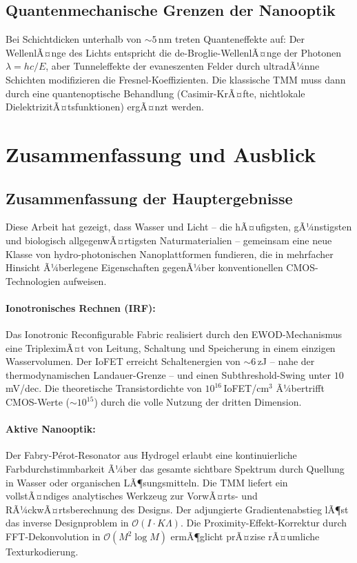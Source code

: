 ﻿\documentclass[a4paper,12pt]{scrreprt}
\theoremstyle{definition}
\newcommand{\ordre}[1]{\mathcal{O}\!\left(#1\right)}
\begin{document}
\subsection{Quantenmechanische Grenzen der Nanooptik}

Bei Schichtdicken unterhalb von $\sim 5$\,nm treten Quanteneffekte auf:
Der WellenlÃ¤nge des Lichts entspricht die de-Broglie-WellenlÃ¤nge der
Photonen $\lambda = hc/E$, aber Tunneleffekte der evaneszenten Felder
durch ultradÃ¼nne Schichten modifizieren die Fresnel-Koeffizienten. Die
klassische TMM muss dann durch eine quantenoptische Behandlung (Casimir-KrÃ¤fte,
nichtlokale DielektrizitÃ¤tsfunktionen) ergÃ¤nzt werden.

\section{Zusammenfassung und Ausblick}

\subsection{Zusammenfassung der Hauptergebnisse}

Diese Arbeit hat gezeigt, dass Wasser und Licht -- die hÃ¤ufigsten, gÃ¼nstigsten
und biologisch allgegenwÃ¤rtigsten Naturmaterialien -- gemeinsam eine neue Klasse
von hydro-photonischen Nanoplattformen fundieren, die in mehrfacher Hinsicht
Ã¼berlegene Eigenschaften gegenÃ¼ber konventionellen CMOS-Technologien aufweisen.

\paragraph{Ionotronisches Rechnen (IRF):}
Das Ionotronic Reconfigurable Fabric realisiert durch den EWOD-Mechanismus
eine TripleximÃ¤t von Leitung, Schaltung und Speicherung in einem einzigen
Wasservolumen. Der IoFET erreicht Schaltenergien von $\sim 6$\,zJ -- nahe
der thermodynamischen Landauer-Grenze -- und einen Subthreshold-Swing unter
$10$\,mV/dec. Die theoretische Transistordichte von $10^{16}$\,IoFET/cm$^3$
Ã¼bertrifft CMOS-Werte ($\sim 10^{15}$) durch die volle Nutzung der dritten
Dimension.

\paragraph{Aktive Nanooptik:}
Der Fabry-P{\'e}rot-Resonator aus Hydrogel erlaubt eine kontinuierliche
Farbdurchstimmbarkeit Ã¼ber das gesamte sichtbare Spektrum durch Quellung
in Wasser oder organischen LÃ¶sungsmitteln. Die TMM liefert ein vollstÃ¤ndiges
analytisches Werkzeug zur VorwÃ¤rts- und RÃ¼ckwÃ¤rtsberechnung des Designs.
Der adjungierte Gradientenabstieg lÃ¶st das inverse Designproblem in
$\ordre{I \cdot K\Lambda}$. Die Proximity-Effekt-Korrektur durch FFT-Dekonvolution
in $\ordre{M^2 \log M}$ ermÃ¶glicht prÃ¤zise rÃ¤umliche Texturkodierung.
\end{document}
